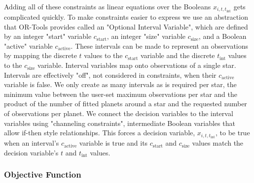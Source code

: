 Adding all of these constraints as linear equations over the Booleans $x_{i, t,
t_{\textrm{int}}}$ gets complicated quickly. To make constraints easier to
express we use an abstraction that OR-Tools provides called an "Optional
Interval Variable", which are defined by an integer "start" variable
$c_\textrm{start}$, an integer "size" variable $c_\textrm{size}$, and a Boolean
"active" variable $c_\textrm{active}$. These intervals can be made to represent
an observations by mapping the discrete $t$ values to the $c_\textrm{start}$
variable and the discrete $t_\textrm{int}$ values to the $c_\textrm{size}$
variable. Interval variables map onto observations of a single star. Intervals
are effectively "off", not considered in constraints, when their
$c_\textrm{active}$ variable is false. We only create as many intervals as is
required per star, the minimum value between the user-set maximum observations
per star and the product of the number of fitted planets around a star and the
requested number of observations per planet. We connect the decision variables
to the interval variables using "channeling constraints", intermediate Boolean
variables that allow if-then style relationships. This forces a decision
variable, $x_{i, t, t_{\textrm{int}}}$, to be true when an interval's
$c_\textrm{active}$ variable is true and its $c_\textrm{start}$ and
$c_\textrm{size}$ values match the decision variable's $t$ and $t_\textrm{int}$
values.

\subsubsection{Objective Function}

